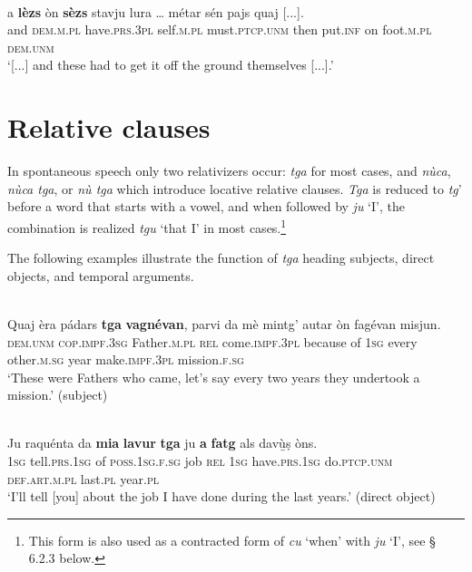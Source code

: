 \ea
\label{ex:sezs3pl}
\\
\gll [...] a \textbf{lèzs} òn \textbf{sèzs} stavju lura … métar sén pajs quaj [...]. \\
{} and \textsc{dem.m.pl} have.\textsc{prs.3pl} self.\textsc{m.pl} must.\textsc{ptcp.unm} then {} put.\textsc{inf} on foot.\textsc{m.pl} \textsc{dem.unm}\\
\glt `[...] and these had to get it off the ground themselves [...].'
\z


\section{Relative clauses}
In spontaneous speech only two relativizers occur: \textit{tga} for most cases, and \textit{nùca}, \textit{nùca tga}, or \textit{nù tga} which introduce locative relative clauses. \textit{Tga} is reduced to \textit{tg}' before a word that starts with a vowel, and when followed by \textit{ju} `I', the combination is realized \textit{tgu} `that I' in most cases.\footnote{This form is also used as a contracted form of \textit{cu} `when' with \textit{ju} `I', see § 6.2.3 below.}

The following examples illustrate the function of \textit{tga} heading subjects, direct objects, and temporal arguments.

\ea
{}\\
\gll   Quaj èra pádars \textbf{tga} \textbf{vagnévan}, parvi da mè mintg’ autar òn fagévan misjun. \\
\textsc{dem.unm} \textsc{cop.impf.3sg} Father.\textsc{m.pl} \textsc{rel} come.\textsc{impf.3pl} because of \textsc{1sg} every other.\textsc{m.sg} year make.\textsc{impf.3pl} mission.\textsc{f.sg} \\
\glt `These were Fathers who came, let’s say every two years they undertook a mission.' (subject)
\z

\ea
{}\\
\gll   Ju raquénta da \textbf{mia} \textbf{lavur} \textbf{tga} ju \textbf{\textbf{a}} \textbf{fatg} als davù̱ṣ òns. \\
\textsc{1sg} tell.\textsc{prs.1sg} of \textsc{poss.1sg.f.sg} job \textsc{rel} \textsc{1sg}  have.\textsc{prs.1sg} do.\textsc{ptcp.unm} \textsc{def.art.m.pl} last.\textsc{pl} year.\textsc{pl}\\
\glt `I’ll tell [you] about the job I have done during the last years.' (direct object)
\z

